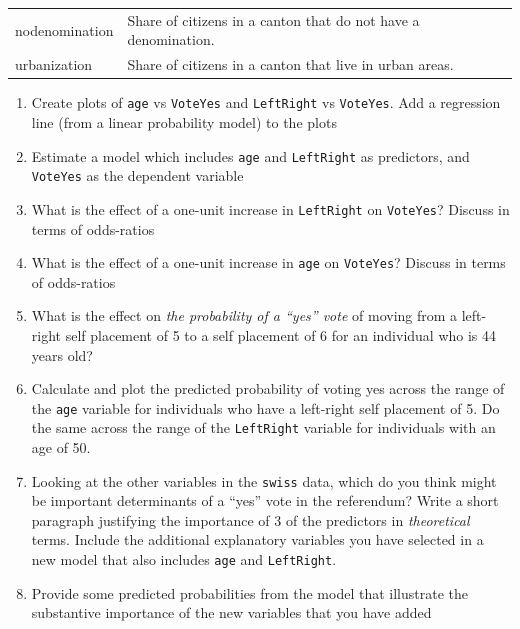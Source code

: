 \documentclass[]{article}
\providecommand{\tightlist}{%
  \setlength{\itemsep}{0pt}\setlength{\parskip}{0pt}}
\theoremstyle{definition}
\theoremstyle{definition}
\theoremstyle{definition}
\theoremstyle{remark}
\begin{document}
\begin{longtable}[]{@{}ll@{}}
\begin{minipage}[t]{0.11\columnwidth}\raggedright\strut
nodenomination\strut
\end{minipage} & \begin{minipage}[t]{0.83\columnwidth}\raggedright\strut
Share of citizens in a canton that do not have a denomination.\strut
\end{minipage}\tabularnewline
\begin{minipage}[t]{0.11\columnwidth}\raggedright\strut
urbanization\strut
\end{minipage} & \begin{minipage}[t]{0.83\columnwidth}\raggedright\strut
Share of citizens in a canton that live in urban areas.\strut
\end{minipage}\tabularnewline
\bottomrule
\end{longtable}

\begin{enumerate}
\def\labelenumi{\arabic{enumi}.}
\tightlist
\item
  Create plots of \texttt{age} vs \texttt{VoteYes} and
  \texttt{LeftRight} vs \texttt{VoteYes}. Add a regression line (from a
  linear probability model) to the plots
\item
  Estimate a model which includes \texttt{age} and \texttt{LeftRight} as
  predictors, and \texttt{VoteYes} as the dependent variable
\item
  What is the effect of a one-unit increase in \texttt{LeftRight} on
  \texttt{VoteYes}? Discuss in terms of odds-ratios
\item
  What is the effect of a one-unit increase in \texttt{age} on
  \texttt{VoteYes}? Discuss in terms of odds-ratios
\item
  What is the effect on \emph{the probability of a ``yes'' vote} of
  moving from a left-right self placement of 5 to a self placement of 6
  for an individual who is 44 years old?
\item
  Calculate and plot the predicted probability of voting yes across the
  range of the \texttt{age} variable for individuals who have a
  left-right self placement of 5. Do the same across the range of the
  \texttt{LeftRight} variable for individuals with an age of 50.
\item
  Looking at the other variables in the \texttt{swiss} data, which do
  you think might be important determinants of a ``yes'' vote in the
  referendum? Write a short paragraph justifying the importance of 3 of
  the predictors in \emph{theoretical} terms. Include the additional
  explanatory variables you have selected in a new model that also
  includes \texttt{age} and \texttt{LeftRight}.
\item
  Provide some predicted probabilities from the model that illustrate
  the substantive importance of the new variables that you have added
\end{enumerate}
\end{document}

